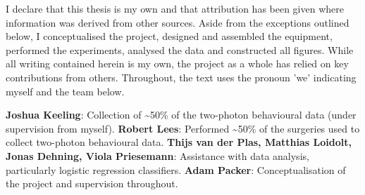 I declare that this thesis is my own and that attribution has been given where information was derived from other sources. Aside from the exceptions outlined below, I conceptualised the project, designed and assembled the equipment, performed the experiments, analysed the data and constructed all figures. While all writing contained herein is my own, the project as a whole has relied on key contributions from others. Throughout, the text uses the pronoun 'we' indicating myself and the team below.

\textbf{Joshua Keeling}: Collection of \textasciitilde 50\% of the two-photon behavioural data (under supervision from myself). \textbf{Robert Lees}: Performed \textasciitilde 50\% of the surgeries used to collect two-photon behavioural data. \textbf{Thijs van der Plas, Matthias Loidolt, Jonas Dehning, Viola Priesemann}: Assistance with data analysis, particularly logistic regression classifiers. \textbf{Adam Packer}: Conceptualisation of the project and supervision throughout.